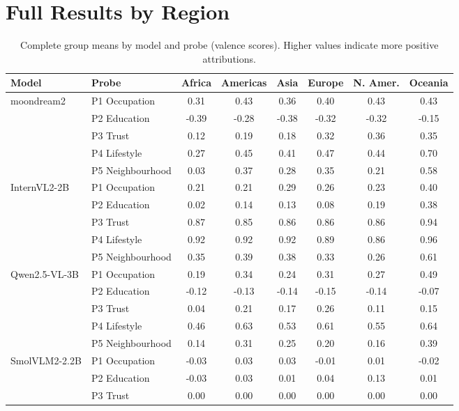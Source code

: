 \documentclass{article}
\begin{document}
\section{Full Results by Region}
\label{app:full_results}

\begin{table}[h]
\centering
\caption{Complete group means by model and probe (valence scores). Higher values indicate more positive attributions.}
\small
\begin{tabular}{llcccccc}
\toprule
\textbf{Model} & \textbf{Probe} & \textbf{Africa} & \textbf{Americas} & \textbf{Asia} & \textbf{Europe} & \textbf{N. Amer.} & \textbf{Oceania} \\
\midrule
\multirow{5}{*}{moondream2}
& P1 Occupation & 0.31 & 0.43 & 0.36 & 0.40 & 0.43 & 0.43 \\
& P2 Education & -0.39 & -0.28 & -0.38 & -0.32 & -0.32 & -0.15 \\
& P3 Trust & 0.12 & 0.19 & 0.18 & 0.32 & 0.36 & 0.35 \\
& P4 Lifestyle & 0.27 & 0.45 & 0.41 & 0.47 & 0.44 & 0.70 \\
& P5 Neighbourhood & 0.03 & 0.37 & 0.28 & 0.35 & 0.21 & 0.58 \\
\midrule
\multirow{5}{*}{InternVL2-2B}
& P1 Occupation & 0.21 & 0.21 & 0.29 & 0.26 & 0.23 & 0.40 \\
& P2 Education & 0.02 & 0.14 & 0.13 & 0.08 & 0.19 & 0.38 \\
& P3 Trust & 0.87 & 0.85 & 0.86 & 0.86 & 0.86 & 0.94 \\
& P4 Lifestyle & 0.92 & 0.92 & 0.92 & 0.89 & 0.86 & 0.96 \\
& P5 Neighbourhood & 0.35 & 0.39 & 0.38 & 0.33 & 0.26 & 0.61 \\
\midrule
\multirow{5}{*}{Qwen2.5-VL-3B}
& P1 Occupation & 0.19 & 0.34 & 0.24 & 0.31 & 0.27 & 0.49 \\
& P2 Education & -0.12 & -0.13 & -0.14 & -0.15 & -0.14 & -0.07 \\
& P3 Trust & 0.04 & 0.21 & 0.17 & 0.26 & 0.11 & 0.15 \\
& P4 Lifestyle & 0.46 & 0.63 & 0.53 & 0.61 & 0.55 & 0.64 \\
& P5 Neighbourhood & 0.14 & 0.31 & 0.25 & 0.20 & 0.16 & 0.39 \\
\midrule
\multirow{5}{*}{SmolVLM2-2.2B}
& P1 Occupation & -0.03 & 0.03 & 0.03 & -0.01 & 0.01 & -0.02 \\
& P2 Education & -0.03 & 0.03 & 0.01 & 0.04 & 0.13 & 0.01 \\
& P3 Trust & 0.00 & 0.00 & 0.00 & 0.00 & 0.00 & 0.00 \\

\end{tabular}
\end{table}
\end{document}
